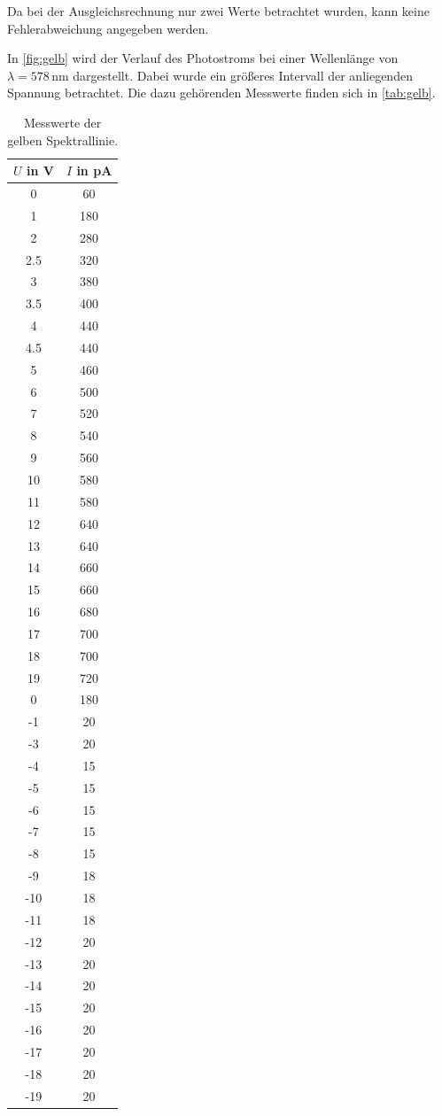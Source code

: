 Da bei der Ausgleichsrechnung nur zwei Werte betrachtet wurden, kann keine Fehlerabweichung angegeben werden.



In \autoref{fig:gelb} wird der Verlauf des Photostroms bei einer Wellenlänge von $\lambda = 578 \,\unit{\nm}$ dargestellt. Dabei wurde ein größeres 
Intervall der anliegenden Spannung betrachtet. Die dazu gehörenden Messwerte finden sich in \autoref{tab:gelb}.

\begin{table}
    \centering 
    \caption{Messwerte der gelben Spektrallinie.}
\begin{tabular}{c c}
    \toprule
    $U$ in V&$I$ in pA \\
    \midrule
    0&60 \\
    1&180 \\
    2&280 \\
  2.5&320 \\
    3&380 \\
  3.5&400 \\
    4&440 \\
  4.5&440 \\
    5&460 \\
    6&500 \\
    7&520 \\
    8&540 \\
    9&560 \\
   10&580 \\
   11&580 \\
   12&640 \\
   13&640 \\
   14&660 \\
   15&660 \\
   16&680 \\
   17&700 \\
   18&700 \\
   19&720 \\
    0&180 \\
    -1&20 \\
    -3&20 \\
    -4&15 \\
    -5&15 \\
    -6&15 \\
    -7&15 \\
    -8&15 \\
    -9&18 \\
   -10&18 \\
   -11&18 \\
   -12&20 \\
   -13&20 \\
   -14&20 \\
   -15&20 \\
   -16&20 \\
   -17&20 \\
   -18&20 \\
   -19&20 \\
    \bottomrule
\end{tabular}
\label{tab:gelb}
\end{table}

